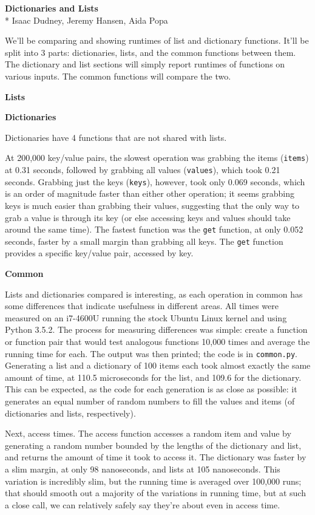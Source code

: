\documentclass[11pt]{article}
\begin{document}
\noindent
\textbf{Dictionaries and Lists}\\*
Isaac Dudney, Jeremy Hansen, Aida Popa

We'll be comparing and showing runtimes of list and dictionary functions.
It'll be split into 3 parts: dictionaries, lists, and the common functions between them.
The dictionary and list sections will simply report runtimes of functions on various inputs.
The common functions will compare the two.

\noindent
\textbf{Lists}


\noindent
\textbf{Dictionaries}

Dictionaries have 4 functions that are not shared with lists.

At 200,000 key/value pairs, the slowest operation was grabbing the items (\texttt{items}) at 0.31 seconds, followed by grabbing all values (\texttt{values}), which took 0.21 seconds.
Grabbing just the keys (\texttt{keys}), however, took only 0.069 seconds, which is an order of magnitude faster than either other operation; it seems grabbing keys is much easier than grabbing their values, suggesting that the only way to grab a value is through its key (or else accessing keys and values should take around the same time).
The fastest function was the \texttt{get} function, at only 0.052 seconds, faster by a small margin than grabbing all keys.
The \texttt{get} function provides a specific key/value pair, accessed by key.

\noindent
\textbf{Common}

Lists and dictionaries compared is interesting, as each operation in common has some differences that indicate usefulness in different areas.
All times were measured on an i7-4600U running the stock Ubuntu Linux kernel and using Python 3.5.2.
The process for measuring differences was simple: create a function or function pair that would test analogous functions 10,000 times and average the running time for each.
The output was then printed; the code is in \texttt{common.py}.
Generating a list and a dictionary of 100 items each took almost exactly the same amount of time, at 110.5 microseconds for the list, and 109.6 for the dictionary.
This can be expected, as the code for each generation is as close as possible: it generates an equal number of random numbers to fill the values and items (of dictionaries and lists, respectively).

Next, access times.
The access function accesses a random item and value by generating a random number bounded by the lengths of the dictionary and list, and returns the amount of time it took to access it.
The dictionary was faster by a slim margin, at only 98 nanoseconds, and lists at 105 nanoseconds.
This variation is incredibly slim, but the running time is averaged over 100,000 runs; that should smooth out a majority of the variations in running time, but at such a close call, we can relatively safely say they're about even in access time.
\end{document}
